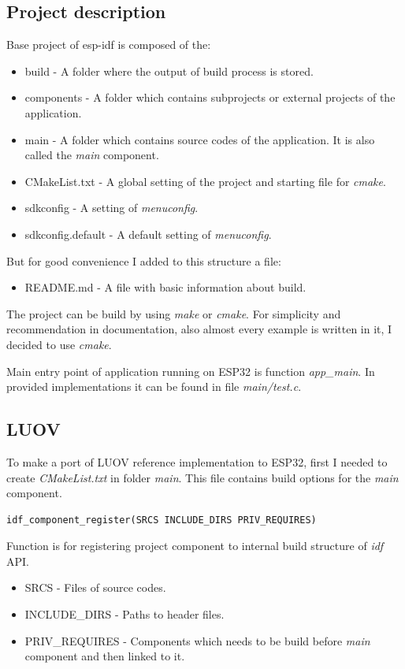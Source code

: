 \documentclass[thesis=M,english]{FITthesis}[2019/12/23]
\begin{document}
\subsection{Project description}
Base project of esp-idf is composed of the:
\begin{itemize}
\item	build - A folder where the output of build process is stored.
\item	components - A folder which contains subprojects or external projects of the application.
\item	main - A folder which contains source codes of the application. It is also called the \textit{main} component. 
\item	CMakeList.txt - A global setting of the project and starting file for \textit{cmake}. 
\item	sdkconfig - A setting of \textit{menuconfig}.
\item	sdkconfig.default - A default setting of \textit{menuconfig}.
\end{itemize}
But for good convenience I added to this structure a file:
\begin{itemize}
\item	README.md - A file with basic information about build.
\end{itemize}

\noindent
The project can be build by using \textit{make} or \textit{cmake}. For simplicity and recommendation in documentation, also almost every example is written in it, I decided to use \textit{cmake}.

\bigskip
\noindent
Main entry point of application running on ESP32 is function \textit{app\_main}. In provided implementations it can be found in file \textit{main/test.c}.

\subsection{LUOV} \label{esp-luov-make}
To make a port of LUOV reference implementation to ESP32, first I needed to create \textit{CMakeList.txt} in folder \textit{main}. This file contains build options for the \textit{main} component.
\begin{lstlisting}[frame=single]
idf_component_register(SRCS INCLUDE_DIRS PRIV_REQUIRES)
\end{lstlisting}
Function is for registering project component to internal build structure of \textit{idf} API.
\begin{itemize}
\item	SRCS  - Files of source codes.
\item	INCLUDE\_DIRS - Paths to header files.
\item	PRIV\_REQUIRES - Components which needs to be build before \textit{main} component and then linked to it.
\end{itemize}
\end{document}
